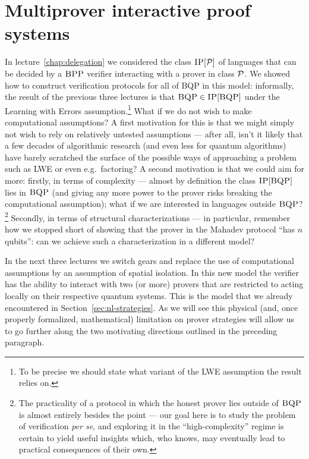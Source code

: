 \chapter{Multiprover interactive proof systems}

In lecture~\ref{chap:delegation} we considered the class $\textsc{IP}[\mathcal{P}]$ of languages that can be decided by a $\textsc{BPP}$ verifier interacting with a prover in class $\mathcal{P}$. We showed how to construct  verification protocols for all of BQP in this model: informally, the result of the previous three lectures is that $\textsc{BQP} \in \textsc{IP}[\textsc{BQP}]$ under the Learning with Errors assumption.\footnote{To be precise we should state what variant of the LWE assumption the result relies on.} What if we do not wish to make computational assumptions? A first motivation for this is that we might simply not wish to rely on relatively untested assumptions --- after all, isn't it likely that a few decades of algorithmic research (and even less for quantum algorithms) have barely scratched the surface of the possible ways of approaching a problem such as LWE or even e.g.\ factoring? A second motivation is that we could aim for more: firstly, in terms of complexity --- almost by definition the class $\textsc{IP}[\textsc{BQP}]$ lies in $\textsc{BQP}$ (and giving any more power to the prover risks breaking the computational assumption); what if we are interested in languages outside $\textsc{BQP}$?\footnote{The practicality of a protocol in which the honest prover lies outside of $\textsc{BQP}$ is almost entirely besides the point --- our goal here is to study the problem of verification \emph{per se}, and exploring it in the ``high-complexity'' regime is certain to yield useful insights which, who knows, may eventually lead to practical consequences of their own.}
 Secondly, in terms of structural characterizations --- in particular, remember how we stopped short of showing that the prover in the Mahadev protocol ``has $n$ qubits'': can we achieve such a characterization in a different model? 

In the next three lectures we switch gears and replace the use of computational assumptions by an assumption of spatial isolation. In this new model the verifier has the ability to interact with two (or more) provers that are restricted to acting locally on their respective quantum systems. This is the model that we already encountered in Section~\ref{sec:nl-strategies}. As we will see this  physical (and, once properly formalized, mathematical) limitation on prover strategies will allow us to go further along the two motivating directions outlined in the preceding paragraph. 

